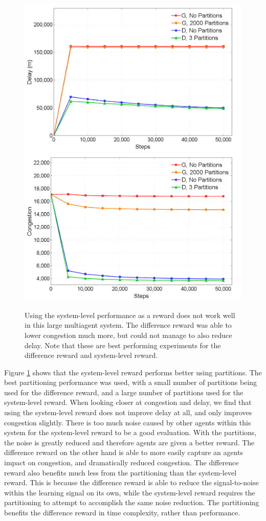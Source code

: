 \documentclass[onehalf,11pt]{beavtex}
\begin{document}
\begin{figure}[]
\centering
\includegraphics[width=.75\columnwidth]{ClusterVsNoClusterNonGreedy-Delay}
\includegraphics[width=.75\columnwidth]{ClusterVsNoClusterNonGreedy}
\caption{Using the system-level performance as a reward does not work well in this large multiagent system. The difference reward was able to lower congestion much more, but could not manage to also reduce delay. Note that these are best performing experiments for the difference reward and system-level reward.}
\label{NonClusterVsCluster}
\end{figure}

Figure \ref{NonClusterVsCluster} shows that the system-level reward performs better using partitions. The best partitioning performance was used, with a small number of partitions being used for the difference reward, and a large number of partitions used for the system-level reward. When looking closer at congestion and delay, we find that using the system-level reward does not improve delay at all, and only improves congestion slightly. There is too much noise caused by other agents within this system for the system-level reward to be a good evaluation. With the partitions, the noise is greatly reduced and therefore agents are given a better reward. The difference reward on the other hand is able to more easily capture an agents impact on congestion, and dramatically reduced congestion. The difference reward also benefits much less from the partitioning than the system-level reward. This is because the difference reward is able to reduce the signal-to-noise within the learning signal on its own, while the system-level reward requires the partitioning to attempt to accomplish the same noise reduction. The partitioning benefits the difference reward in time complexity, rather than performance.
\end{document}
